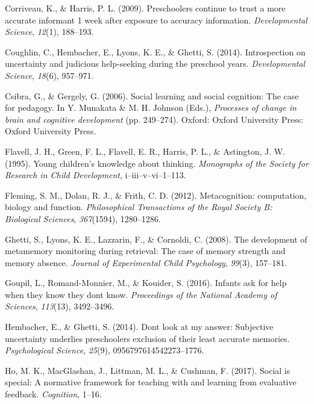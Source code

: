\documentclass[a4paper,man,apacite,floatsintext]{apa6}
\begin{document}
\hypertarget{ref-Corriveau2009}{}
Corriveau, K., \& Harris, P. L. (2009). Preschoolers continue to trust a
more accurate informant 1 week after exposure to accuracy information.
\emph{Developmental Science}, \emph{12}(1), 188--193.

\hypertarget{ref-Coughlin2014}{}
Coughlin, C., Hembacher, E., Lyons, K. E., \& Ghetti, S. (2014).
Introspection on uncertainty and judicious help-seeking during the
preschool years. \emph{Developmental Science}, \emph{18}(6), 957--971.

\hypertarget{ref-Csibra2006}{}
Csibra, G., \& Gergely, G. (2006). Social learning and social cognition:
The case for pedagogy. In Y. Munakata \& M. H. Johnson (Eds.),
\emph{Processes of change in brain and cognitive development} (pp.
249--274). Oxford: Oxford University Press: Oxford University Press.

\hypertarget{ref-Flavell1995}{}
Flavell, J. H., Green, F. L., Flavell, E. R., Harris, P. L., \&
Astington, J. W. (1995). Young children's knowledge about thinking.
\emph{Monographs of the Society for Research in Child Development},
i--iii--v--vi--1--113.

\hypertarget{ref-Fleming2012}{}
Fleming, S. M., Dolan, R. J., \& Frith, C. D. (2012). Metacognition:
computation, biology and function. \emph{Philosophical Transactions of
the Royal Society B: Biological Sciences}, \emph{367}(1594), 1280--1286.

\hypertarget{ref-Ghetti2008}{}
Ghetti, S., Lyons, K. E., Lazzarin, F., \& Cornoldi, C. (2008). The
development of metamemory monitoring during retrieval: The case of
memory strength and memory absence. \emph{Journal of Experimental Child
Psychology}, \emph{99}(3), 157--181.

\hypertarget{ref-Goupil2016}{}
Goupil, L., Romand-Monnier, M., \& Kouider, S. (2016). Infants ask for
help when they know they dont know. \emph{Proceedings of the National
Academy of Sciences}, \emph{113}(13), 3492--3496.

\hypertarget{ref-Hembacher2014}{}
Hembacher, E., \& Ghetti, S. (2014). Dont look at my answer: Subjective
uncertainty underlies preschoolers exclusion of their least accurate
memories. \emph{Psychological Science}, \emph{25}(9),
0956797614542273--1776.

\hypertarget{ref-Ho2017}{}
Ho, M. K., MacGlashan, J., Littman, M. L., \& Cushman, F. (2017). Social
is special: A normative framework for teaching with and learning from
evaluative feedback. \emph{Cognition}, 1--16.
\end{document}
